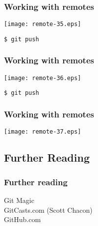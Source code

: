 \documentclass[english]{beamer}
\newcommand{\mysubsection}[2]{%
  \hypertarget{#2}{}%
  \subsection{#1}%
  \label{#2}%
}
\newcommand{\CMD}[1]{%
\texttt{\textcolor{code-blue}{#1}}%
}
\newcommand{\faint}[1]{%
\textcolor{code-gray}{#1}%
}
\newcommand{\blue}[1]{%
\textcolor{code-blue}{#1}%
}
\begin{document}
\begin{frame}[fragile]
\frametitle{Working with remotes}

\texttt{[image: remote-35.eps]}

\begin{center}
\CMD{\$ git push}
\end{center}

\vspace{\textheight}
\end{frame}

\begin{frame}[fragile]
\frametitle{Working with remotes}

\texttt{[image: remote-36.eps]}

\begin{center}
\CMD{\$ git push}
\end{center}

\vspace{\textheight}
\end{frame}

\begin{frame}[fragile]
\frametitle{Working with remotes}

\texttt{[image: remote-37.eps]}

\vspace{\textheight}
\end{frame}
\mysubsection{Further Reading}{using:end}
\begin{frame}
\frametitle{Further reading}
\begin{center}
        \blue{Git Magic} \\
        \blue{GitCasts.com} \faint{(Scott Chacon)} \\
        \blue{GitHub.com} \\
\end{center}
\end{frame}

\end{document}
